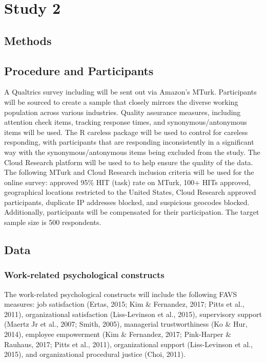 \documentclass[
  man]{apa7}
\begin{document}
\hypertarget{study-2}{%
\section{Study 2}\label{study-2}}

\hypertarget{methods-1}{%
\subsection{Methods}\label{methods-1}}

\hypertarget{procedure-and-participants-1}{%
\subsection{Procedure and Participants}\label{procedure-and-participants-1}}

A Qualtrics survey including will be sent out via Amazon's MTurk. Participants will be sourced to create a sample that closely mirrors the diverse working population across various industries. Quality assurance measures, including attention check items, tracking response times, and synonymous/antonymous items will be used. The R careless package will be used to control for careless responding, with participants that are responding inconsistently in a significant way with the synonymous/antonymous items being excluded from the study. The Cloud Research platform will be used to to help ensure the quality of the data. The following MTurk and Cloud Research inclusion criteria will be used for the online survey: approved 95\% HIT (task) rate on MTurk, 100+ HITs approved, geographical locations restricted to the United States, Cloud Research approved participants, duplicate IP addresses blocked, and suspicious geocodes blocked. Additionally, participants will be compensated for their participation. The target sample size is 500 respondents.

\hypertarget{data-1}{%
\subsection{Data}\label{data-1}}

\hypertarget{work-related-psychological-constructs}{%
\subsubsection{Work-related psychological constructs}\label{work-related-psychological-constructs}}

The work-related psychological constructs will include the following FAVS measures: job satisfaction (Ertas, 2015; Kim \& Fernandez, 2017; Pitts et al., 2011), organizational satisfaction (Liss-Levinson et al., 2015), supervisory support (Maertz Jr et al., 2007; Smith, 2005), managerial trustworthiness (Ko \& Hur, 2014), employee empowerment (Kim \& Fernandez, 2017; Pink-Harper \& Rauhaus, 2017; Pitts et al., 2011), organizational support (Liss-Levinson et al., 2015), and organizational procedural justice (Choi, 2011).
\end{document}
